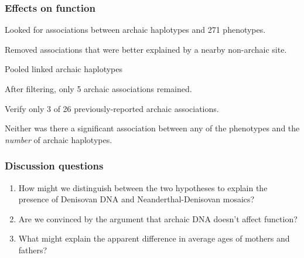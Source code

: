 \documentclass[pdftex,12pt]{beamer}
\begin{document}
\begin{frame}
  \frametitle{Effects on function}

  Looked for associations between archaic haplotypes and 271
  phenotypes.

  \bigskip

  Removed associations that were better explained by a nearby
  non-archaic site.

  \bigskip

  Pooled linked archaic haplotypes

  \bigskip

  After filtering, only 5 archaic associations remained.

  \bigskip

  Verify only 3 of 26 previously-reported archaic associations.

  \bigskip

  Neither was there a significant association between any of the
  phenotypes and the \emph{number} of archaic haplotypes.

\end{frame}

\begin{frame}
  \frametitle{Discussion questions}
  \begin{enumerate}
    \item How might we distinguish between the two hypotheses to
      explain the presence of Denisovan DNA and Neanderthal-Denisovan
      mosaics? 
    \item Are we convinced by the argument that archaic DNA doesn't
      affect function?
    \item What might explain the apparent difference in average ages
      of mothers and fathers?
  \end{enumerate}
\end{frame}
\end{document}
